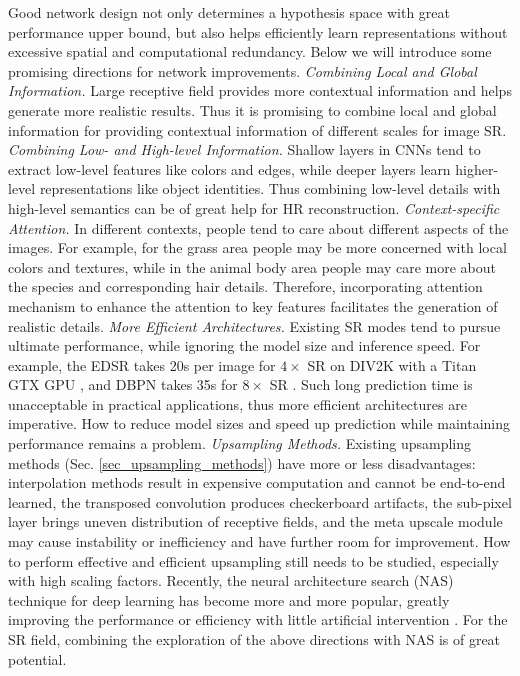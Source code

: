 {Good network design not only determines a hypothesis space with great performance upper bound, but also helps efficiently learn representations without excessive spatial and computational redundancy.
Below we will introduce some promising directions for network improvements.
\textit{Combining Local and Global Information.}
Large receptive field provides more contextual information and helps generate more realistic results.
Thus it is promising to combine local and global information for providing contextual information of different scales for image SR.
\textit{Combining Low- and High-level Information.}
Shallow layers in CNNs tend to extract low-level features like colors and edges, while deeper layers learn higher-level representations like object identities.
Thus combining low-level details with high-level semantics can be of great help for HR reconstruction.
\textit{Context-specific Attention.}
In different contexts, people tend to care about different aspects of the images.
For example, for the grass area people may be more concerned with local colors and textures, while in the animal body area people may care more about the species and corresponding hair details.
Therefore, incorporating attention mechanism to enhance the attention to key features facilitates the generation of realistic details.  
\textit{More Efficient Architectures.}
Existing SR modes tend to pursue ultimate performance, while ignoring the model size and inference speed.
For example, the EDSR  takes 20s per image for $4\times$ SR on DIV2K  with a Titan GTX GPU , and DBPN  takes 35s for $8\times$ SR .
Such long prediction time is unacceptable in practical applications, thus more efficient architectures are imperative.
How to reduce model sizes and speed up prediction while maintaining performance remains a problem.
\textit{Upsampling Methods.}
Existing upsampling methods (Sec. \ref{sec_upsampling_methods}) have more or less disadvantages:
interpolation methods result in expensive computation and cannot be end-to-end learned, the transposed convolution produces checkerboard artifacts, the sub-pixel layer brings uneven distribution of receptive fields, and the meta upscale module may cause instability or inefficiency and have further room for improvement.
How to perform effective and efficient upsampling still needs to be studied, especially with high scaling factors.
Recently, the neural architecture search (NAS) technique for deep learning has become more and more popular, greatly improving the performance or efficiency with little artificial intervention .
For the SR field, combining the exploration of the above directions with NAS is of great potential.

}
